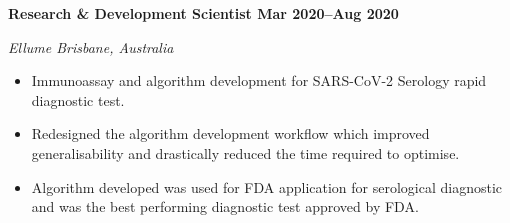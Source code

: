 \textbf{Research \& Development Scientist \hfill Mar 2020--Aug 2020}\par
\textit{Ellume \hfill Brisbane, Australia}\par
\begin{itemize}
	\item Immunoassay and algorithm development for SARS-CoV-2 Serology rapid diagnostic test.
	\item Redesigned the algorithm development workflow which improved generalisability and drastically reduced the time required to optimise.
    \item Algorithm developed was used for FDA application for serological diagnostic and was the best performing diagnostic test approved by FDA.
\end{itemize}\par